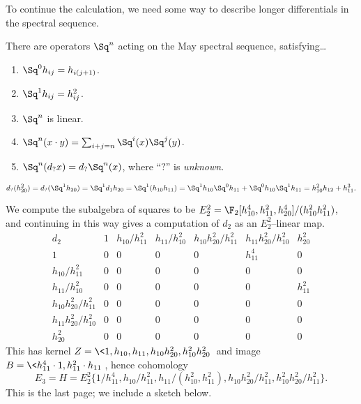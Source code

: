 To continue the calculation, we need some way to describe longer differentials in the spectral sequence.

\begin{theorem}[Nakamura]
There are operators $\Sq^n$ acting on the May spectral sequence, satisfying\ldots
\begin{enumerate}
    \item $\Sq^0 h_{ij} = h_{i(j+1)}$.
    \item $\Sq^1 h_{ij} = h_{ij}^2$.
    \item $\Sq^n$ is linear.
    \item $\Sq^n(x \cdot y) = \sum_{i+j=n} \Sq^i(x) \Sq^j(y)$.
    \item $\Sq^n(d_? x) = d_? \Sq^n(x)$, where ``$?$'' is \emph{unknown}.
\end{enumerate}
\end{theorem}

\begin{example}
\[d_?(h_{20}^2) = d_?(\Sq^1 h_{20}) = \Sq^1 d_1 h_{20} = \Sq^1(h_{10} h_{11}) = \Sq^1 h_{10} \Sq^0 h_{11} + \Sq^0 h_{10} \Sq^1 h_{11} = h_{10}^2 h_{12} + h_{11}^3.\]
\end{example}

We compute the subalgebra of squares to be $E_2^2 = \F_2[h_{10}^4, h_{11}^2, h_{20}^4] / (h_{10}^2 h_{11}^2)$, and continuing in this way gives a computation of $d_2$ as an $E_2^2$--linear map.
\[
\begin{array}{c|cccccc}
d_2 & 1 & h_{10}/h_{11}^2 & h_{11}/h_{10}^2 & h_{10}h_{20}^2/h_{11}^2 & h_{11}h_{20}^2/h_{10}^2 & h_{20}^2 \\
1 &                       0 & 0 & 0 & 0 & h_{11}^4 & 0 \\
h_{10}/h_{11}^2 &         0 & 0 & 0 & 0 &        0 & 0 \\
h_{11}/h_{10}^2 &         0 & 0 & 0 & 0 &        0 & h_{11}^2 \\
h_{10}h_{20}^2/h_{11}^2 & 0 & 0 & 0 & 0 &        0 & 0 \\
h_{11}h_{20}^2/h_{10}^2 & 0 & 0 & 0 & 0 &        0 & 0 \\
h_{20}^2                & 0 & 0 & 0 & 0 &        0 & 0               
\end{array}
\]
This has kernel $Z = \<1, h_{10}, h_{11}, h_{10}h_{20}^2, h_{10}^2h_{20}^2\>$ and image $B = \<h_{11}^4 \cdot 1, h_{11}^2 \cdot h_{11}\>$, hence cohomology \[E_3 = H = E_2^2\{1 / h_{11}^4, h_{10}/h_{11}^2, h_{11} / (h_{10}^2, h_{11}^2), h_{10}h_{20}^2/h_{11}^2, h_{10}^2h_{20}^2 / h_{11}^2\}.\]  This is the last page; we include a sketch below.

